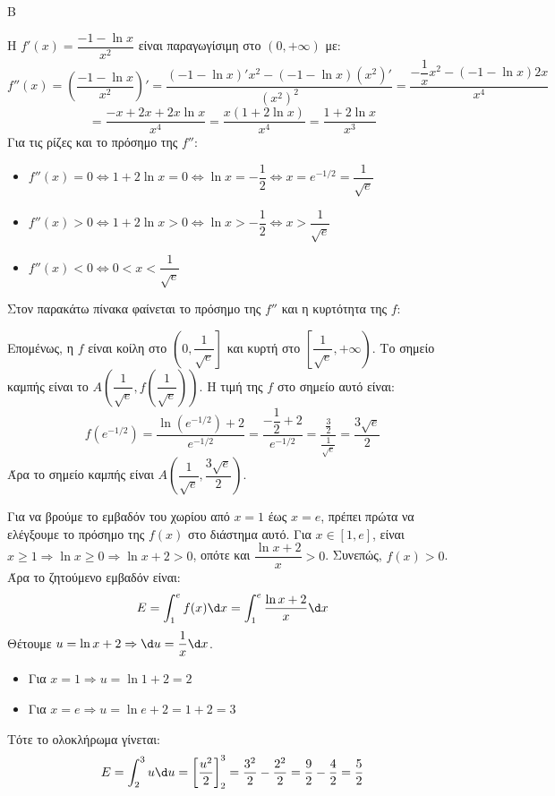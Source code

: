 \begin{thema}{Β}
\begin{erwthma}
\item Η $f'(x) = \dfrac{-1-\ln x}{x^2}$ είναι παραγωγίσιμη στο $(0, +\infty)$ με:
\[ f''(x) = \left( \dfrac{-1-\ln x}{x^2} \right)' = \dfrac{(-1-\ln x)' x^2 - (-1-\ln x)(x^2)'}{(x^2)^2} = \dfrac{-\dfrac{1}{x}x^2 - (-1-\ln x)2x}{x^4} \]
\[ = \dfrac{-x + 2x + 2x\ln x}{x^4} = \dfrac{x(1 + 2\ln x)}{x^4} = \dfrac{1 + 2\ln x}{x^3} \]
Για τις ρίζες και το πρόσημο της $f''$:
\begin{itemize}
    \item $f''(x) = 0 \Leftrightarrow 1 + 2\ln x = 0 \Leftrightarrow \ln x = -\dfrac{1}{2} \Leftrightarrow x = e^{-1/2} = \dfrac{1}{\sqrt{e}}$
    \item $f''(x) > 0 \Leftrightarrow 1 + 2\ln x > 0 \Leftrightarrow \ln x > -\dfrac{1}{2} \Leftrightarrow x > \dfrac{1}{\sqrt{e}}$
    \item $f''(x) < 0 \Leftrightarrow 0 < x < \dfrac{1}{\sqrt{e}}$
\end{itemize}
Στον παρακάτω πίνακα φαίνεται το πρόσημο της $f''$ και η κυρτότητα της $f$:
\begin{center}
\end{center}
Επομένως, η $f$ είναι κοίλη στο $\left(0, \dfrac{1}{\sqrt{e}}\right]$ και κυρτή στο $\left[\dfrac{1}{\sqrt{e}}, +\infty\right)$.
Το σημείο καμπής είναι το $A\left( \dfrac{1}{\sqrt{e}}, f\left(\dfrac{1}{\sqrt{e}}\right) \right)$.
Η τιμή της $f$ στο σημείο αυτό είναι:
\[ f(e^{-1/2}) = \dfrac{\ln(e^{-1/2}) + 2}{e^{-1/2}} = \dfrac{-\dfrac{1}{2} + 2}{e^{-1/2}} = \dfrac{\frac{3}{2}}{\frac{1}{\sqrt{e}}} = \dfrac{3\sqrt{e}}{2} \]
Άρα το σημείο καμπής είναι $A\left( \dfrac{1}{\sqrt{e}}, \dfrac{3\sqrt{e}}{2} \right)$.

\item Για να βρούμε το εμβαδόν του χωρίου από $x=1$ έως $x=e$, πρέπει πρώτα να ελέγξουμε το πρόσημο της $f(x)$ στο διάστημα αυτό.
Για $x \in [1, e]$, είναι $x \ge 1 \Rightarrow \ln x \ge 0 \Rightarrow \ln x + 2 > 0$, οπότε και $\dfrac{\ln x + 2}{x} > 0$. Συνεπώς, $f(x) > 0$.
Άρα το ζητούμενο εμβαδόν είναι:
\[ E = \int_1^e f(x) \d x = \int_1^e \dfrac{\ln x + 2}{x} \d x \]
Θέτουμε $u = \ln x + 2 \Rightarrow \d u = \dfrac{1}{x} \d x$.
\begin{itemize}
\item Για $x = 1 \Rightarrow u = \ln 1 + 2 = 2$
\item Για $x = e \Rightarrow u = \ln e + 2 = 1+2 = 3$
\end{itemize}
Τότε το ολοκλήρωμα γίνεται:
\[ E = \int_2^3 u \d u = \left[ \dfrac{u^2}{2} \right]_2^3 = \dfrac{3^2}{2} - \dfrac{2^2}{2} = \dfrac{9}{2} - \dfrac{4}{2} = \dfrac{5}{2} \]
\end{erwthma}
\end{thema}

